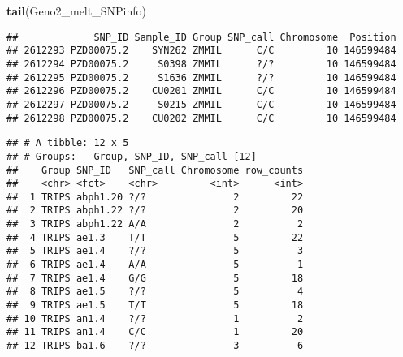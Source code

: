 \documentclass[]{article}
\newenvironment{Shaded}{\begin{snugshade}}{\end{snugshade}}
\newcommand{\KeywordTok}[1]{\textcolor[rgb]{0.13,0.29,0.53}{\textbf{#1}}}
\newcommand{\DataTypeTok}[1]{\textcolor[rgb]{0.13,0.29,0.53}{#1}}
\newcommand{\StringTok}[1]{\textcolor[rgb]{0.31,0.60,0.02}{#1}}
\newcommand{\OperatorTok}[1]{\textcolor[rgb]{0.81,0.36,0.00}{\textbf{#1}}}
\newcommand{\NormalTok}[1]{#1}
\begin{document}
\begin{Shaded}
\begin{Highlighting}[]
\KeywordTok{tail}\NormalTok{(Geno2_melt_SNPinfo)}
\end{Highlighting}
\end{Shaded}

\begin{verbatim}
##             SNP_ID Sample_ID Group SNP_call Chromosome  Position
## 2612293 PZD00075.2    SYN262 ZMMIL      C/C         10 146599484
## 2612294 PZD00075.2     S0398 ZMMIL      ?/?         10 146599484
## 2612295 PZD00075.2     S1636 ZMMIL      ?/?         10 146599484
## 2612296 PZD00075.2    CU0201 ZMMIL      C/C         10 146599484
## 2612297 PZD00075.2     S0215 ZMMIL      C/C         10 146599484
## 2612298 PZD00075.2    CU0202 ZMMIL      C/C         10 146599484
\end{verbatim}

\begin{Shaded}
\end{Shaded}

\begin{verbatim}
## # A tibble: 12 x 5
## # Groups:   Group, SNP_ID, SNP_call [12]
##    Group SNP_ID   SNP_call Chromosome row_counts
##    <chr> <fct>    <chr>         <int>      <int>
##  1 TRIPS abph1.20 ?/?               2         22
##  2 TRIPS abph1.22 ?/?               2         20
##  3 TRIPS abph1.22 A/A               2          2
##  4 TRIPS ae1.3    T/T               5         22
##  5 TRIPS ae1.4    ?/?               5          3
##  6 TRIPS ae1.4    A/A               5          1
##  7 TRIPS ae1.4    G/G               5         18
##  8 TRIPS ae1.5    ?/?               5          4
##  9 TRIPS ae1.5    T/T               5         18
## 10 TRIPS an1.4    ?/?               1          2
## 11 TRIPS an1.4    C/C               1         20
## 12 TRIPS ba1.6    ?/?               3          6
\end{verbatim}

\begin{Shaded}
\end{Shaded}
\end{document}
